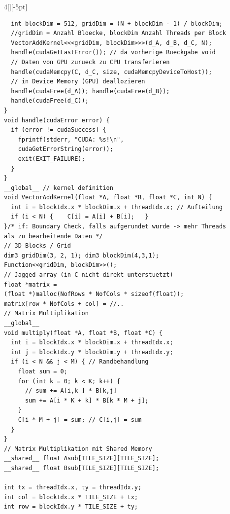 \documentclass[%
	pdftex,%
	a4paper,%
	landscape,%
	ngerman,
	oneside,%
	6pt,%
	halfparskip,%
]{scrbook}
\begin{document}
\begin{multicols}{4}[][-5pt]
\begin{lstlisting}
  int blockDim = 512, gridDim = (N + blockDim - 1) / blockDim;
  //gridDim = Anzahl Bloecke, blockDim Anzahl Threads per Block
  VectorAddKernel<<<gridDim, blockDim>>>(d_A, d_B, d_C, N);
  handle(cudaGetLastError()); // da vorherige Rueckgabe void
  // Daten von GPU zurueck zu CPU transferieren
  handle(cudaMemcpy(C, d_C, size, cudaMemcpyDeviceToHost));
  // in Device Memory (GPU) deallozieren
  handle(cudaFree(d_A)); handle(cudaFree(d_B));
  handle(cudaFree(d_C));
}
void handle(cudaError error) {
  if (error != cudaSuccess) {
    fprintf(stderr, "CUDA: %s!\n",
    cudaGetErrorString(error));
    exit(EXIT_FAILURE);
  }
}
__global__ // kernel definition
void VectorAddKernel(float *A, float *B, float *C, int N) {
  int i = blockIdx.x * blockDim.x + threadIdx.x; // Aufteilung
  if (i < N) {    C[i] = A[i] + B[i];   }
}/* if: Boundary Check, falls aufgerundet wurde -> mehr Threads
als zu bearbeitende Daten */
// 3D Blocks / Grid
dim3 gridDim(3, 2, 1); dim3 blockDim(4,3,1);
Function<<gridDim, blockDim>>();
// Jagged array (in C nicht direkt unterstuetzt)
float *matrix =
(float *)malloc(NofRows * NofCols * sizeof(float));
matrix[row * NofCols + col] = //..
// Matrix Multiplikation
__global__
void multiply(float *A, float *B, float *C) {
  int i = blockIdx.x * blockDim.x + threadIdx.x;
  int j = blockIdx.y * blockDim.y + threadIdx.y;
  if (i < N && j < M) { // Randbehandlung
    float sum = 0;
    for (int k = 0; k < K; k++) {
      // sum += A[i,k ] * B[k,j]
      sum += A[i * K + k] * B[k * M + j];
    }
    C[i * M + j] = sum; // C[i,j] = sum
  }
}
// Matrix Multiplikation mit Shared Memory
__shared__ float Asub[TILE_SIZE][TILE_SIZE];
__shared__ float Bsub[TILE_SIZE][TILE_SIZE];

int tx = threadIdx.x, ty = threadIdx.y;
int col = blockIdx.x * TILE_SIZE + tx;
int row = blockIdx.y * TILE_SIZE + ty;


\end{lstlisting}
\end{multicols}
\end{document}
